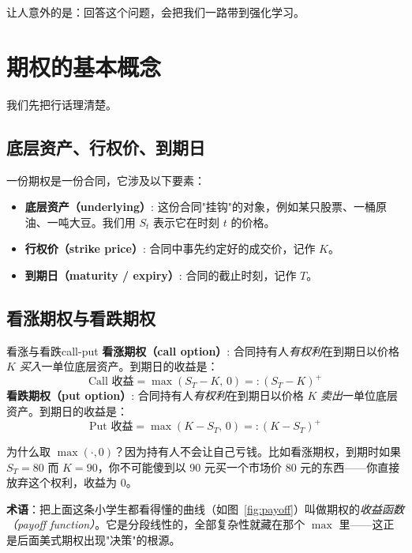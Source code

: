 \documentclass[11pt,a4paper]{ctexart}
\newcommand{\1}{\mathbf{1}}
\begin{document}
让人意外的是：回答这个问题，会把我们一路带到强化学习。

\section{期权的基本概念}

我们先把行话理清楚。

\subsection{底层资产、行权价、到期日}

一份期权是一份合同，它涉及以下要素：

\begin{itemize}[leftmargin=*]
    \item \textbf{底层资产（underlying）}: 这份合同"挂钩"的对象，例如某只股票、一桶原油、一吨大豆。我们用 $S_t$ 表示它在时刻 $t$ 的价格。
    \item \textbf{行权价（strike price）}: 合同中事先约定好的成交价，记作 $K$。
    \item \textbf{到期日（maturity / expiry）}: 合同的截止时刻，记作 $T$。
\end{itemize}

\subsection{看涨期权与看跌期权}

\begin{defn}{看涨与看跌}{call-put}
\textbf{看涨期权（call option）}: 合同持有人\emph{有权利}在到期日以价格 $K$ \emph{买入}一单位底层资产。到期日的收益是：
\[
\text{Call 收益} = \max(S_T - K,\, 0) =: (S_T - K)^+
\]
\textbf{看跌期权（put option）}: 合同持有人\emph{有权利}在到期日以价格 $K$ \emph{卖出}一单位底层资产。到期日的收益是：
\[
\text{Put 收益} = \max(K - S_T,\, 0) =: (K - S_T)^+
\]
\end{defn}

为什么取 $\max(\cdot, 0)$？因为持有人不会让自己亏钱。比如看涨期权，到期时如果 $S_T = 80$ 而 $K = 90$，你不可能傻到以 90 元买一个市场价 80 元的东西——你直接放弃这个权利，收益为 0。

\medskip
\noindent\textbf{术语}：把上面这条小学生都看得懂的曲线（如图~\ref{fig:payoff}）叫做期权的\emph{收益函数（payoff function）}。它是分段线性的，全部复杂性就藏在那个 $\max$ 里——这正是后面美式期权出现"决策"的根源。
\end{document}
